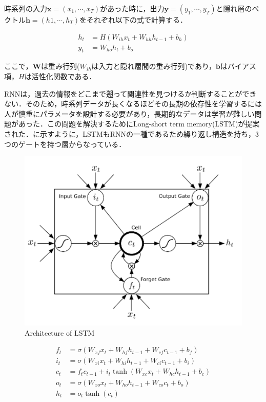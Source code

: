 時系列の入力$\bm{x} = (x_1, \cdots , x_T)$があった時に，出力$\bm{y} = (y_1, \cdots , y_T)$と隠れ層のベクトル$\bm{h} = (h1, \cdots ,h_T)$をそれぞれ以下の式で計算する．

\begin{align}\label{eq:RNN}
	h_t & = H(W_{ih} x_t + W_{hh} h_{t-1} + b_h) \\ 
	y_t & = W_{ho} h_t + b_o
\end{align}

ここで，$\bm{W}$は重み行列($W_{ih}$は入力と隠れ層間の重み行列)であり，$\bm{b}$はバイアス項，$H$は活性化関数である．

RNNは，過去の情報をどこまで遡って関連性を見つけるか判断することができない．そのため，時系列データが長くなるほどその長期の依存性を学習するには人が慎重にパラメータを設計する必要があり，長期的なデータは学習が難しい問題があった．この問題を解決するためにLong-short term memory(LSTM)が提案された．に示すように，LSTMもRNNの一種であるため繰り返し構造を持ち，3つのゲートを持つ層からなっている．

\begin{figure}[h]
	\centering
	\includegraphics[width=0.7\linewidth]{fig/lstm.png}
	\caption{Architecture of LSTM}
	\label{fig:LSTM}
\end{figure}

\begin{align}\label{eq:LSTM}
	f_t & = \sigma(W_{xf} x_t + W_{hf} h_{t-1} + W_{cf} c_{t-1} + b_f ) \\
	i_t & = \sigma(W_{xi} x_t + W_{hi} h_{t-1} + W_{ci} c_{t-1} + b_i) \\
	c_t & = f_t c_{t-1} + i_t \tanh(W_{xc} x_t + W_{hc} h_{t-1} + b_c) \\
	o_t & = \sigma(W_{xo} x_t + W_{ho} h_{t-1} + W_{co} c_t + b_o) \\
	h_t & = o_t \tanh(c_t) 
\end{align}

